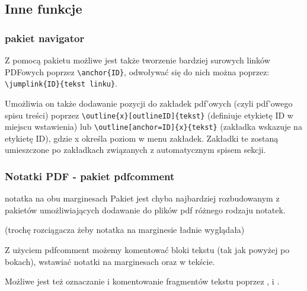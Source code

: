 \documentclass[fontSize=10pt, rmargin=3cm, extra]{pdfArticle}
\begin{document}
\subsection{Inne funkcje}

\subsubsection{pakiet navigator}

Z pomocą pakietu  możliwe jest także tworzenie bardziej surowych linków PDFowych poprzez \Verb$\anchor{ID}$, odwoływać się do nich można poprzez: \Verb$\jumplink{ID}{tekst linku}$.

Umożliwia on także dodawanie pozycji do zakładek pdf'owych (czyli pdf'owego spisu treści) poprzez
	\Verb$\outline{x}[outlineID]{tekst}$ (definiuje etykietę ID w miejscu wstawienia) lub
	\Verb$\outline[anchor=ID]{x}{tekst}$ (zakładka wskazuje na etykietę ID),
	gdzie x określa poziom w menu zakładek.
Zakładki te zostaną umieszczone po zakładkach związanych z automatycznym spisem sekcji.


\subsubsection{Notatki PDF - pakiet pdfcomment}
\begin{pdfsidelinecomment}[color=red,author={Inny Autor},linewidth=3mm,linesep=1cm]{ notatka na obu marginesach }
Pakiet  jest chyba najbardziej rozbudowanym z pakietów umożliwiających dodawanie do plików pdf różnego rodzaju notatek.

(trochę rozciągacza żeby notatka na marginesie ładnie wyglądała) \lipsum[1-2]
\end{pdfsidelinecomment}

\vspace{1cm}

Z użyciem pdfcomment możemy komentować bloki tekstu (tak jak powyżej po bokach), wstawiać notatki na marginesach oraz w  tekście.

Możliwe jest też oznaczanie i komentowanie fragmentów tekstu poprzez
,
 i
.
\end{document}
